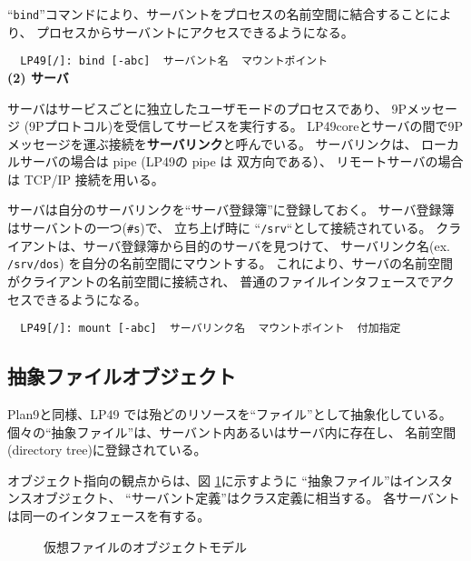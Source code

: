 \documentclass{ipsjpapers}
\begin{document}
``{\tt bind}''コマンドにより、サーバントをプロセスの名前空間に結合することにより、
プロセスからサーバントにアクセスできるようになる。

  \verb|  LP49[/]: bind [-abc]  サーバント名  マウントポイント|  \\


{\bf\flushleft (2) サーバ}

  サーバはサービスごとに独立したユーザモードのプロセスであり、
  9Pメッセージ (9Pプロトコル)を受信してサービスを実行する。
  LP49coreとサーバの間で9Pメッセージを運ぶ接続を{\bf サーバリンク}と呼んでいる。
  サーバリンクは、
  ローカルサーバの場合は pipe (LP49の pipe は 双方向である）、
  リモートサーバの場合は TCP/IP 接続を用いる。

  サーバは自分のサーバリンクを``サーバ登録簿''に登録しておく。
  サーバ登録簿はサーバントの一つ(\verb|#s|)で、 
  立ち上げ時に ``{\tt /srv}``として接続されている。
  クライアントは、サーバ登録簿から目的のサーバを見つけて、
  サーバリンク名(ex. {\tt /srv/dos}) を自分の名前空間にマウントする。
  これにより、サーバの名前空間がクライアントの名前空間に接続され、
  普通のファイルインタフェースでアクセスできるようになる。

  \verb|  LP49[/]: mount [-abc]  サーバリンク名  マウントポイント  付加指定| \\


\subsection{抽象ファイルオブジェクト}

Plan9と同様、LP49 では殆どのリソースを``ファイル''として抽象化している。
個々の``抽象ファイル''は、サーバント内あるいはサーバ内に存在し、
名前空間(directory tree)に登録されている。

オブジェクト指向の観点からは、図 \ref{fig:VirtualFileObject}に示すように
``抽象ファイル''はインスタンスオブジェクト、
``サーバント定義''はクラス定義に相当する。
各サーバントは同一のインタフェースを有する。

\begin{figure}[hbt]
  \begin{center}
   \epsfxsize=340pt
    \caption{仮想ファイルのオブジェクトモデル}
    \label{fig:VirtualFileObject}
  \end{center}
\end{figure}
\end{document}
